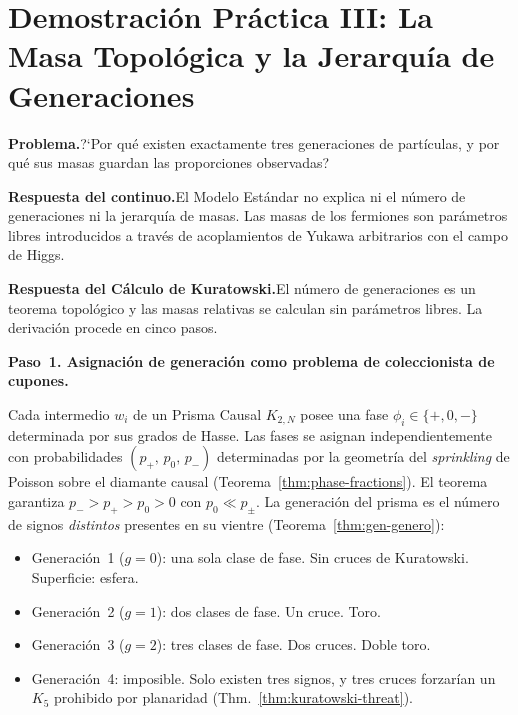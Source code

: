 \documentclass[11pt, a4paper, openany]{book}
\begin{document}
\bigskip

\section*{Demostraci\'on Pr\'actica III: La Masa Topol\'ogica
  y la Jerarqu\'ia de Generaciones}
\label{sec:demo-mass}

\noindent\textbf{Problema.}\enspace ?`Por qu\'e existen exactamente tres
generaciones de part\'iculas, y por qu\'e sus masas guardan las
proporciones observadas?

\noindent\textbf{Respuesta del continuo.}\enspace El Modelo Est\'andar
no explica ni el n\'umero de generaciones ni la jerarqu\'ia de masas.
Las masas de los fermiones son par\'ametros libres introducidos a trav\'es
de acoplamientos de Yukawa arbitrarios con el campo de Higgs.

\noindent\textbf{Respuesta del C\'alculo de Kuratowski.}\enspace El
n\'umero de generaciones es un teorema topol\'ogico y las masas
relativas se calculan sin par\'ametros libres. La derivaci\'on procede en
cinco pasos.

\bigskip
\noindent
\textbf{Paso~1. Asignaci\'on de generaci\'on como problema de
coleccionista de cupones.}

Cada intermedio $w_i$ de un Prisma Causal $K_{2,N}$ posee una fase
$\phi_i \in \{+, 0, -\}$ determinada por sus grados de Hasse. Las fases
se asignan independientemente con probabilidades
$(p_+,\, p_0,\, p_-)$ determinadas por la geometr\'ia del
\emph{sprinkling} de Poisson sobre el diamante causal
(Teorema~\ref{thm:phase-fractions}). El teorema garantiza
$p_- > p_+ > p_0 > 0$ con $p_0 \ll p_\pm$.
La generaci\'on del prisma es el n\'umero de signos \emph{distintos}
presentes en su vientre (Teorema~\ref{thm:gen-genero}):
\begin{itemize}
  \item Generaci\'on~1 ($g = 0$): una sola clase de fase. Sin cruces
        de Kuratowski. Superficie: esfera.
  \item Generaci\'on~2 ($g = 1$): dos clases de fase. Un cruce. Toro.
  \item Generaci\'on~3 ($g = 2$): tres clases de fase. Dos cruces.
        Doble toro.
  \item Generaci\'on~4: imposible. Solo existen tres signos, y tres
        cruces forzar\'ian un $K_5$ prohibido por planaridad
        (Thm.~\ref{thm:kuratowski-threat}).
\end{itemize}
\end{document}
